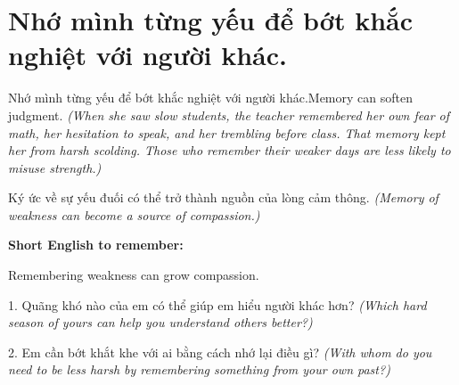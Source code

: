 \section{Nhớ mình từng yếu để bớt khắc nghiệt với người khác.}
\begin{truyen}{Nhớ mình từng yếu để bớt khắc nghiệt với người khác.}{Memory can soften judgment.}
\textit{(When she saw slow students, the teacher remembered her own fear of math, her hesitation to speak, and her trembling before class. That memory kept her from harsh scolding. Those who remember their weaker days are less likely to misuse strength.)}
\end{truyen}
\begin{baihoc}
Ký ức về sự yếu đuối có thể trở thành nguồn của lòng cảm thông.
\textit{(Memory of weakness can become a source of compassion.)}
\end{baihoc}
\begin{ghinhoanh}
\textbf{Short English to remember:}

Remembering weakness can grow compassion.
\end{ghinhoanh}
\begin{tuhocnhanh}
1. Quãng khó nào của em có thể giúp em hiểu người khác hơn? \textit{(Which hard season of yours can help you understand others better?)}

2. Em cần bớt khắt khe với ai bằng cách nhớ lại điều gì? \textit{(With whom do you need to be less harsh by remembering something from your own past?)}
\end{tuhocnhanh}
\ngancach
